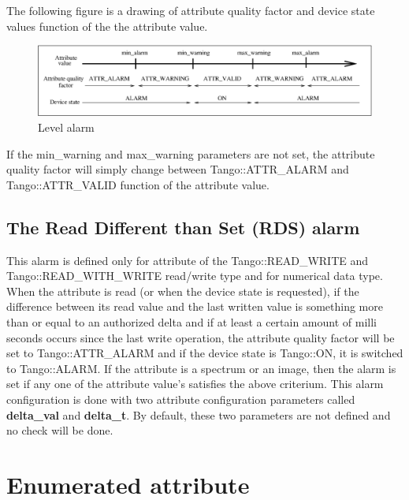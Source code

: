 The following figure is a drawing of attribute quality factor and
device state values function of the the attribute value.

\begin{figure}[H]
\begin{centering}
\includegraphics[scale=0.5]{advanced/alarm}
\par\end{centering}

\protect\caption{Level alarm}
\label{alarm_fig}
\end{figure}


If the min\_warning and max\_warning parameters are not set, the attribute
quality factor will simply change between Tango::ATTR\_ALARM and Tango::ATTR\_VALID
function of the attribute value.


\subsection{The Read Different than Set (RDS) alarm}

This alarm is defined only for attribute of the Tango::READ\_WRITE
and Tango::READ\_WITH\_WRITE read/write type and for numerical data
type. When the attribute is read (or when the device state is requested),
if the difference between its read value and the last written value
is something more than or equal to an authorized delta and if at least
a certain amount of milli seconds occurs since the last write operation,
the attribute quality factor will be set to Tango::ATTR\_ALARM
and if the device state is Tango::ON, it is switched to Tango::ALARM.
If the attribute is a spectrum or an image, then the alarm is set
if any one of the attribute value's satisfies the above criterium.
This alarm configuration is done with two attribute configuration
parameters called \textbf{delta\_val} and \textbf{delta\_t}.
By default, these two parameters are not defined and no check will
be done.


\section{Enumerated attribute}

